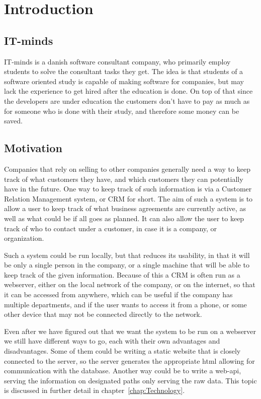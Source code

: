 \chapter{Introduction}
\label{chap:Introduction}

\section{IT-minds}
\label{sec:IT-minds}
IT-minds is a danish software consultant company, who primarily employ students
to solve the consultant tasks they get. The idea is that students of a software oriented
study is capable of making software for companies, but may lack the experience to get hired
after the education is done. On top of that since the developers are under education
the customers don't have to pay as much as for someone who is done with their study,
and therefore some money can be saved.


\section{Motivation}
\label{sec:Motivation}
Companies that rely on selling to other companies generally need a way to keep track of
what customers they have, and which customers they can potentially have in the future.
One way to keep track of such information is via a Customer Relation Management system,
or CRM for short. The aim of such a system is to allow a user to keep track of what
business agreements are currently active, as well as what could be if all goes as planned.
It can also allow the user to keep track of who to contact under a customer, in case it is
a company, or organization.

Such a system could be run locally, but that reduces its usability, in that it will
be only a single person in the company, or a single machine that will be able to keep
track of the given information. Because of this a CRM is often run as a webserver, either
on the local network of the company, or on the internet, so that it can be accessed
from anywhere, which can be useful if the company has multiple departments, and if the
user wants to access it from a phone, or some other device that may not be connected
directly to the network.

Even after we have figured out that we want the system to be run on a webserver we still have
different ways to go, each with their own advantages and disadvantages. Some of them
could be writing a static website that is closely connected to the server, so the server
generates the appropriate html allowing for communication with the database.
Another way could be to write a web-api, serving the information on designated paths
only serving the raw data. This topic is discussed in further detail in chapter~\ref{chap:Technology}.

